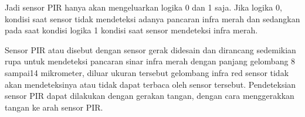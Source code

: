 Jadi sensor PIR hanya akan mengeluarkan logika 0 dan 1 saja. Jika logika 0, kondisi saat sensor tidak mendeteksi adanya pancaran infra merah dan sedangkan pada saat kondisi logika 1 kondisi saat sensor mendeteksi infra merah.

Sensor PIR atau disebut dengan sensor gerak didesain dan dirancang sedemikian rupa untuk mendeteksi pancaran sinar infra merah dengan panjang gelombang 8 sampai14 mikrometer, diluar ukuran tersebut gelombang infra red sensor tidak akan mendeteksinya atau tidak dapat terbaca oleh sensor tersebut. Pendeteksian sensor PIR  dapat dilakukan dengan gerakan tangan, dengan cara menggerakkan tangan ke arah sensor PIR.